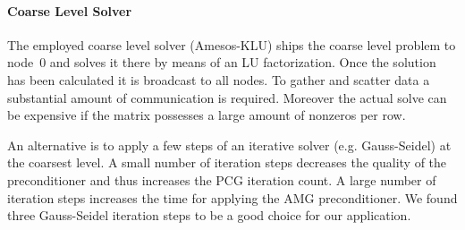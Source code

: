 \paragraph{Coarse Level Solver} The employed coarse level solver
(Amesos-KLU) ships the coarse level problem to node~0 and solves it
there by means of an LU factorization.  Once the solution has been
calculated it is broadcast to all nodes.  To gather and scatter data a
substantial amount of communication is required.  Moreover the actual
solve can be expensive if the matrix possesses a large amount of
nonzeros per row.

An alternative is to apply a few steps of an iterative solver (e.g.
Gauss-Seidel) at the coarsest level.  A small number of iteration steps
decreases the quality of the preconditioner and thus increases the PCG
iteration count.  A large number of iteration steps increases the time
for applying the AMG preconditioner.  We found three Gauss-Seidel
iteration steps to be a good choice for our application.


